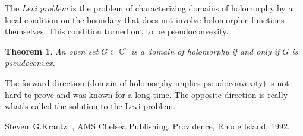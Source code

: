 \documentclass[12pt]{article}
\theoremstyle{theorem}
\newtheorem*{thm}{Theorem}
\theoremstyle{definition}
\begin{document}
The {\em Levi problem} is the problem of characterizing domains of
holomorphy by a local condition on the boundary that does not involve
holomorphic functions themselves.  This condition turned out to
be pseudoconvexity.

\begin{thm}
An open set $G \subset {\mathbb{C}}^n$ is a domain of holomorphy if
and only if $G$ is pseudoconvex.
\end{thm}

The forward direction (domain of holomorphy implies pseudoconvexity) is
not hard to prove and was known for a long time.  The opposite direction
is really what's called the solution to the Levi problem.

\begin{thebibliography}{9}
Steven~G.\@ Krantz.
{\em {}},
AMS Chelsea Publishing, Providence, Rhode Island, 1992.
\end{thebibliography}
\end{document}
